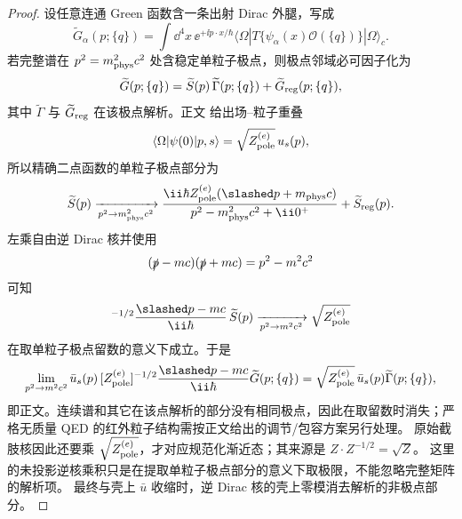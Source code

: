 \begin{proof}
设任意连通 Green 函数含一条出射 Dirac 外腿，写成
\begin{equation*}
 \widetilde G_\alpha(p;\{q\})
 =\int\dd^4 x\,\ee^{+\ii p\cdot x/\hbar}
 \langle\Omega|T\{\psi_\alpha(x)\mathcal O(\{q\})\}|\Omega\rangle_c.
\end{equation*}
若完整谱在 $p^2=m_{\rm phys}^2c^2$ 处含稳定单粒子极点，则极点邻域必可因子化为
\begin{equation*}
 \widetilde G(p;\{q\})
 =\widetilde S(p)\,\widetilde\Gamma(p;\{q\})
 +\widetilde G_{\rm reg}(p;\{q\}),
\end{equation*}
其中 $\widetilde\Gamma$ 与 $\widetilde G_{\rm reg}$ 在该极点解析。正文 给出场--粒子重叠
\begin{equation*}
 \langle\Omega|\psi(0)|p,s\rangle=\sqrt{Z_{\rm pole}^{(e)}}\,u_s(p),
\end{equation*}
所以精确二点函数的单粒子极点部分为
\begin{equation*}
 \widetilde S(p)
 \xrightarrow[p^2\to m_{\rm phys}^2c^2]{}
 \frac{\ii\hbar Z_{\rm pole}^{(e)}(\slashed p+m_{\rm phys}c)}
 {p^2-m_{\rm phys}^2c^2+\ii0^+}
 +\widetilde S_{\rm reg}(p).
\end{equation*}
左乘自由逆 Dirac 核并使用
\begin{equation*}
 (\slashed p-mc)(\slashed p+mc)=p^2-m^2c^2
\end{equation*}
可知
\begin{equation*}
 [Z_{\rm pole}^{(e)}]^{-1/2}\frac{\slashed p-mc}{\ii\hbar}\,\widetilde S(p)
 \xrightarrow[p^2\to m^2c^2]{}\sqrt{Z_{\rm pole}^{(e)}}
\end{equation*}
在取单粒子极点留数的意义下成立。于是
\begin{equation*}
 \lim_{p^2\to m^2c^2}
 \bar u_s(p)\,
 [Z_{\rm pole}^{(e)}]^{-1/2}\frac{\slashed p-mc}{\ii\hbar}
 \widetilde G(p;\{q\})
 =\sqrt{Z_{\rm pole}^{(e)}}\,\bar u_s(p)\widetilde\Gamma(p;\{q\}),
\end{equation*}
即正文。连续谱和其它在该点解析的部分没有相同极点，因此在取留数时消失；严格无质量 QED 的红外粒子结构需按正文给出的调节/包容方案另行处理。
原始截肢核因此还要乘 $\sqrt{Z_{\rm pole}^{(e)}}$，才对应规范化渐近态；其来源是 $Z\cdot Z^{-1/2}=\sqrt Z$。
这里的未投影逆核乘积只是在提取单粒子极点部分的意义下取极限，不能忽略完整矩阵的解析项。
最终与壳上 $\bar u$ 收缩时，逆 Dirac 核的壳上零模消去解析的非极点部分。

\end{proof}


